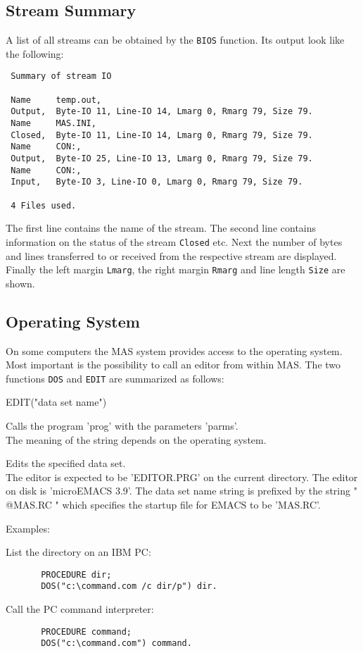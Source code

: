 \subsection{Stream Summary}

A list of all streams can be obtained by the
\verb/BIOS/ function.  
Its output look like the following:
{\small
\begin{verbatim}
 Summary of stream IO 
 
 Name     temp.out, 
 Output,  Byte-IO 11, Line-IO 14, Lmarg 0, Rmarg 79, Size 79. 
 Name     MAS.INI, 
 Closed,  Byte-IO 11, Line-IO 14, Lmarg 0, Rmarg 79, Size 79. 
 Name     CON:, 
 Output,  Byte-IO 25, Line-IO 13, Lmarg 0, Rmarg 79, Size 79. 
 Name     CON:, 
 Input,   Byte-IO 3, Line-IO 0, Lmarg 0, Rmarg 79, Size 79. 
 
 4 Files used. 
\end{verbatim}}

The first line contains the name of the stream. 
The second line contains information on the
status of the stream \verb/Closed/ etc. 
Next the number of bytes and lines transferred to or
received from the respective stream are displayed.
Finally the left margin \verb/Lmarg/, the
right margin \verb/Rmarg/ and line length \verb/Size/
are shown.


\subsection{Operating System}

On some computers the MAS system provides 
access to the operating system.
Most important is the possibility to call an editor
from within MAS. 
The two functions \verb/DOS/ and \verb/EDIT/ are summarized
as follows:
\begin{deflist}{EDIT("data set name")}
\item[DOS("prog parms")]  Calls the program 'prog' 
                          with the parameters 'parms'. \\
                          The meaning of the string depends 
                          on the operating system.
\item[EDIT("data set name")] Edits the specified data set.  \\
          The editor is expected to be 
          'EDITOR.PRG' on the current
          directory. 
          The editor on disk is 'microEMACS 3.9'. 
          The data set name string is prefixed by the
          string " @MAS.RC " which specifies the startup file
          for EMACS to be 'MAS.RC'. 
\end{deflist}

Examples: 

List the directory on an IBM PC:
\begin{verbatim}
       PROCEDURE dir;
       DOS("c:\command.com /c dir/p") dir.
\end{verbatim}

Call the PC command interpreter:
\begin{verbatim}
       PROCEDURE command;
       DOS("c:\command.com") command.
\end{verbatim}


